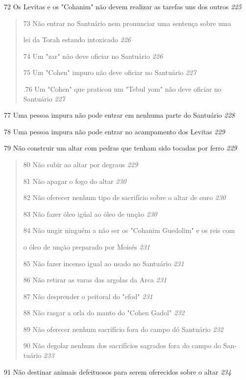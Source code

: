 72 Os Levitas e os "Cohanim" não devem realizar as tarefas uns dos
outros \emph{225}

\begin{quote}
73 Não entrar no Santuário nem pronunciar uma sentença sobre uma

lei da Torah estando intoxicado \emph{226}

74 Um "zar" não deve oficiar no Santuário \emph{226}

75 Um "Cohen" impuro não deve oficiar no Santuário \emph{227}

.76 Um "Cohen" que praticou um "Tebul yom" não deve oficiar no Santuário
\emph{227}
\end{quote}

77 Uma pessoa impura não pode entrar em nenhuma parte do Santuário
\emph{228}

78 Uma pessoa impura não pode entrar no acampamento dos Levitas
\emph{229}

79 Não construir um altar com pedras que tenham sido tocadas por ferro
\emph{229}

\begin{quote}
80 Não subir ao altar por degraus \emph{229}

81 Não apagar o fogo do altar \emph{230}

82 Não oferecer nenhum tipo de sacrifício sobre o altar de ouro
\emph{230}

83 Não fazer óleo igúal ao óleo de unção \emph{230}

84 Não ungir ninguém a não ser os "Cohanim Guedolim" e os reis com

o óleo de unção preparado por Moisés \emph{231}

85 Não fazer incenso igual ao usado no Santuário \emph{231}

86 Não retirar as varas das argolas da Arca \emph{231}

87 Não desprender o peitoral do "efod" \emph{231}

88 Não rasgar a orla do manto do "Cohen Gadol" \emph{232}

89 Não oferecer nenhum sacrifício fora do campo dó Santuário \emph{232}

90 Não degolar nenhum dos sacrifícios sagrados fora do campo do
San­tuário \emph{233}
\end{quote}

91 Não destinar animais defeituosos para serem oferecidos sobre o altar
\emph{234}

